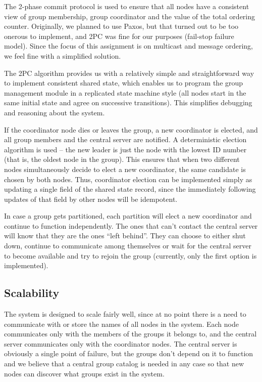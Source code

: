 \documentclass[10pt, oneside]{article}
\begin{document}
The 2-phase commit protocol is used to ensure that all nodes have a consistent
view of group membership, group coordinator and the value of the total ordering
counter. Originally, we planned to use Paxos, but that turned out to be too
onerous to implement, and 2PC was fine for our purposes (fail-stop failure
model). Since the focus of this assignment is on multicast and message ordering,
we feel fine with a simplified solution.

The 2PC algorithm provides us with a relatively simple and straightforward way
to implement consistent shared state, which enables us to program the group
management module in a replicated state machine style (all nodes start in the
same initial state and agree on successive transitions). This simplifies
debugging and reasoning about the system.

If the coordinator node dies or leaves the group, a new coordinator is elected,
and all group members and the central server are notified. A deterministic
election algorithm is used -- the new leader is just the node with the lowest ID
number (that is, the oldest node in the group). This ensures that when two
different nodes simultaneously decide to elect a new coordinator, the same
candidate is chosen by both nodes. Thus, coordinator election can be implemented
simply as updating a single field of the shared state record, since the
immediately following updates of that field by other nodes will be idempotent.

In case a group gets partitioned, each partition will elect a new coordinator
and continue to function independently. The ones that can't contact the central
server will know that they are the ones ``left behind''. They can choose to
either shut down, continue to communicate among themselves or wait for the
central server to become available and try to rejoin the group (currently, only
the first option is implemented).

\subsection{Scalability}

The system is designed to scale fairly well, since at no point there is a need
to communicate with or store the names of all nodes in the system. Each node
communicates only with the members of the groups it belongs to, and the central
server communicates only with the coordinator nodes. The central server is
obviously a single point of failure, but the groups don't depend on it to
function and we believe that a central group catalog is needed in any case so
that new nodes can discover what groups exist in the system.
\end{document}
